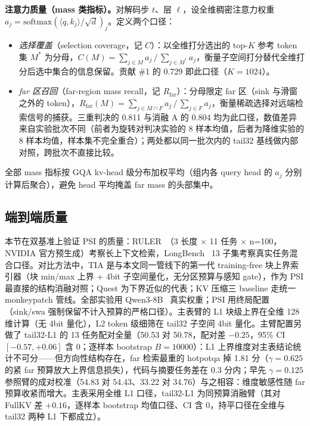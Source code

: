 \documentclass[11pt]{article}
\begin{document}
\textbf{注意力质量（mass 类指标）。}对解码步 $t$、层 $\ell$，设全维稠密注意力权重 $a_j = \mathrm{softmax}(\langle q, k_j\rangle / \sqrt{d})_j$。定义两个口径：
\begin{itemize}
\item \emph{选择覆盖}（selection coverage，记 $C$）：以全维打分选出的 top-$K$ 参考 token 集 $M^\ast$ 为分母，$C(M) = \sum_{j \in M} a_j \,/\, \sum_{j \in M^\ast} a_j$，衡量子空间打分替代全维打分后选中集合的信息保留。贡献 \#1 的 0.729 即此口径（$K{=}1024$）。
\item \emph{far 区召回}（far-region mass recall，记 $R_{\mathrm{far}}$）：分母限定 far 区（sink 与滑窗之外的 token），$R_{\mathrm{far}}(M) = \sum_{j \in M \cap F} a_j \,/\, \sum_{j \in F} a_j$，衡量稀疏选择对远端检索信号的捕获。三重判决的 0.811 与消融 A 的 0.804 均为此口径，数值差异来自实验批次不同（前者为旋转对判决实验的 8 样本均值，后者为降维实验的 8 样本均值，样本集不完全重合）；两处都以同一批次内的 tail32 基线做内部对照，跨批次不直接比较。
\end{itemize}
全部 mass 指标按 GQA kv-head 级分布加权平均（组内各 query head 的 $a_j$ 分别计算后聚合），避免 head 平均掩盖 far mass 的头部集中。

\subsection{端到端质量}

本节在双基准上验证 PSI 的质量：RULER~\cite{ruler}（3 长度 $\times$ 11 任务 $\times$ n=100，NVIDIA 官方预生成）考察长上下文检索，LongBench~\cite{longbench} 13 子集考察真实任务混合口径。对比方法中，TIA 是与本文同一管线下的第一代 training-free 块上界索引器（块 min/max 上界 + 4bit 子空间量化，无分区预算与感知 gate），作为 PSI 最直接的结构消融对照；Quest 为下界近似的代表；KV 压缩三 baseline 走统一 monkeypatch 管线。全部实验用 Qwen3-8B~\cite{qwen3} 真实权重；PSI 用终局配置（sink/swa 强制保留不计入预算的严格口径）。主表臂的 L1 块级上界在全维 128 维计算（无 4bit 量化），L2 token 级细筛在 tail32 子空间 4bit 量化。主臂配置另做了 tail32-L1 的 13 任务配对全量（50.53 对 50.78，配对差 $-0.25$，95\% CI $[-0.57, +0.06]$ 含 0；逐样本 bootstrap $B{=}10000$）：L1 上界维度对主表结论统计不可分——但方向性结构存在，far 检索最重的 hotpotqa 掉 1.81 分（$\gamma{=}0.625$ 的紧 far 预算放大上界信息损失），代码与摘要任务差在 0.3 分内；早先 $\gamma{=}0.125$ 参照臂的成对校准（54.83 对 54.43、33.22 对 34.76）与之相容：维度敏感性随 far 预算收紧而增大。主表采用全维 L1 口径，tail32-L1 为同预算消融臂（其对 FullKV 差 $+0.16$，逐样本 bootstrap 均值口径、CI 含 0，持平口径在全维与 tail32 两种 L1 下都成立）。
\end{document}
